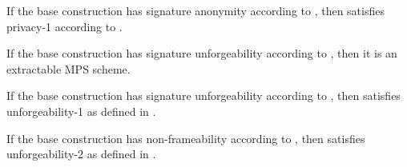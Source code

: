 \begin{theorem}
  If the base \CUASGen construction has signature anonymity according to
  , then \CUASMPS satisfies privacy-1
  according to \needcite.
\end{theorem}

\begin{theorem}
  If the base \CUASGen construction has signature unforgeability according to
  , then it is an extractable MPS scheme.
\end{theorem}

\begin{theorem}
  If the base \CUASGen construction has signature unforgeability according to
  , then \CUASMPS satisfies unforgeability-1 as
  defined in \needcite.
\end{theorem}

\begin{theorem}
  If the base \CUASGen construction has non-frameability according to
  , then \CUASMPS satisfies unforgeability-2 as
  defined in \needcite.
\end{theorem}

